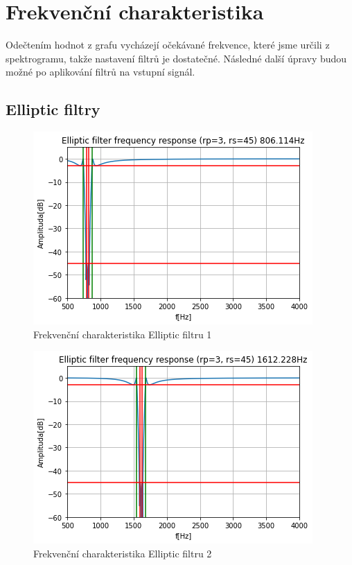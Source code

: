 \documentclass{article}
\begin{document}
\newpage
\section{Frekvenční charakteristika}

Odečtením hodnot z grafu vycházejí očekávané frekvence, které jsme určili z spektrogramu, takže nastavení filtrů je dostatečné.
Následné další úpravy budou možné po aplikování filtrů na vstupní signál.

\subsection{Elliptic filtry}
\begin{figure}[H] 
	\centering
	\includegraphics[scale=0.65,keepaspectratio]{Figure_10}
	\caption{Frekvenční charakteristika Elliptic filtru 1}
\end{figure}

\begin{figure}[H] 
	\centering
	\includegraphics[scale=0.65,keepaspectratio]{Figure_11}
	\caption{Frekvenční charakteristika Elliptic filtru 2}
\end{figure}
\end{document}
